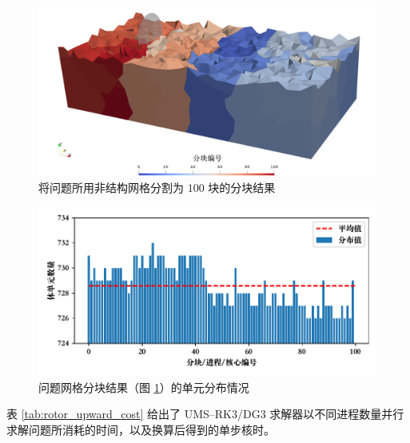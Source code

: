 \begin{figure}[h!]
\begin{centering}
\includegraphics[width=1\textwidth,height=0.4\textheight,keepaspectratio]{figures/upward/partition}
\par\end{centering}
\caption{\label{fig:rotor_upward_partition}将问题所用非结构网格分割为
$100$ 块的分块结果}
\end{figure}

\begin{figure}[h!]
\begin{centering}
\includegraphics[width=1\textwidth,height=0.3\textheight,keepaspectratio]{figures/upward/balance}
\par\end{centering}
\caption{\label{fig:rotor_upward_balance}问题网格分块结果（图
\ref{fig:rotor_upward_partition}）的单元分布情况}
\end{figure}

表 \ref{tab:rotor_upward_cost} 给出了 UMS–RK3/DG3 求解器以不同进程数量并行求解问题所消耗的时间，以及换算后得到的单步核时。

